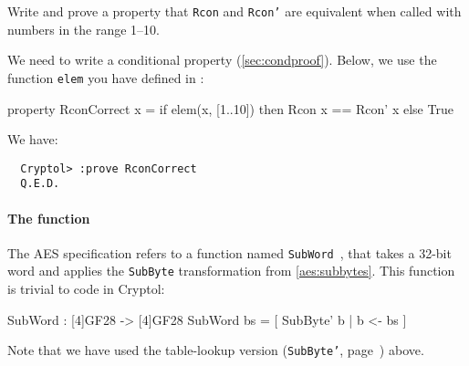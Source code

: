 \begin{Exercise}\label{ex:aeskerc:1}
  Write and prove a property that {\tt Rcon} and {\tt Rcon'} are
  equivalent when called with numbers in the range 1--10.
\end{Exercise}
\begin{Answer}
  We need to write a conditional property
  (\autoref{sec:condproof})\indThmCond. Below, we use the function
  {\tt elem} you have defined in
  :\indElem
\begin{code}
  property RconCorrect x = if elem(x, [1..10])
                           then Rcon x == Rcon' x
                           else True
\end{code}
We have:
\begin{Verbatim}
  Cryptol> :prove RconCorrect
  Q.E.D.
\end{Verbatim}
\end{Answer}


\paragraph*{The {} function} The AES\indAES
specification refers to a function named {\tt SubWord}~\cite[section
5.2]{aes}, that takes a 32-bit word and applies the {\tt SubByte}
transformation from \autoref{aes:subbytes}. This function is
trivial to code in Cryptol:
\begin{code}
  SubWord : [4]GF28 -> [4]GF28
  SubWord bs = [ SubByte' b | b <- bs ]
\end{code}
Note that we have used the table-lookup version ({\tt SubByte'},
page~\pageref{aes:subbytetl}) above.


